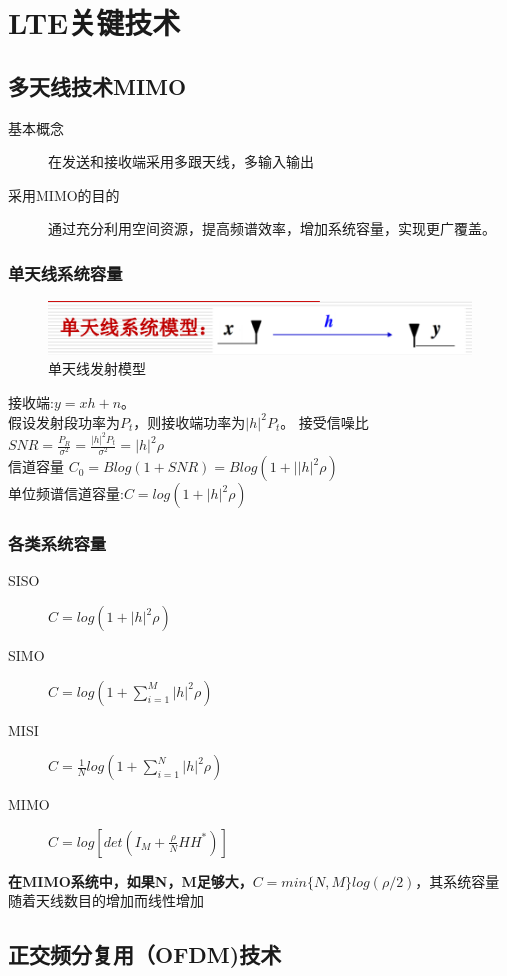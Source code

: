 \documentclass{article}
\begin{document}
	\section{LTE关键技术}
	\subsection{多天线技术MIMO}
	\begin{description}
		\item[基本概念] 在发送和接收端采用多跟天线，多输入输出
		\item[采用MIMO的目的] 通过充分利用空间资源，提高频谱效率，增加系统容量，实现更广覆盖。
	\end{description}
	\subsubsection{单天线系统容量}
	\begin{figure}[H]
		\centering
		\includegraphics[width=0.7\linewidth]{单天线发射模型}
		\caption{单天线发射模型}
		\label{fig:}
	\end{figure}
	接收端:\(y = xh+n\)。\\
	假设发射段功率为$P_t$，则接收端功率为$|h|^2P_t$。
	接受信噪比$SNR = \frac{P_R}{\sigma^2}=\frac{|h|^2P_t}{\sigma^2}=|h|^2\rho$\\
	信道容量 $C_0 = Blog(1+SNR) = Blog(1+||h|^2\rho)$ \\
	单位频谱信道容量:$C = log(1+|h|^2\rho)$	\\
	\subsubsection{各类系统容量}
	\begin{description}
		\item[SISO] $C = log(1+|h|^2\rho)$
		\item[SIMO] $C = log(1+\sum_{i = 1}^{M}|h|^2\rho)$
		\item[MISI] $C = \frac{1}{N}log(1+\sum_{i = 1}^{N}|h|^2\rho)$
		\item[MIMO] $C = log[det(I_M+\frac{\rho}{N}HH^{*})]$
	\end{description}
	\textbf{在MIMO系统中，如果N，M足够大，$C = min\{N,M\}log(\rho/2)$}，其系统容量随着天线数目的增加而线性增加
	\subsection{正交频分复用（OFDM)技术}
\end{document}
